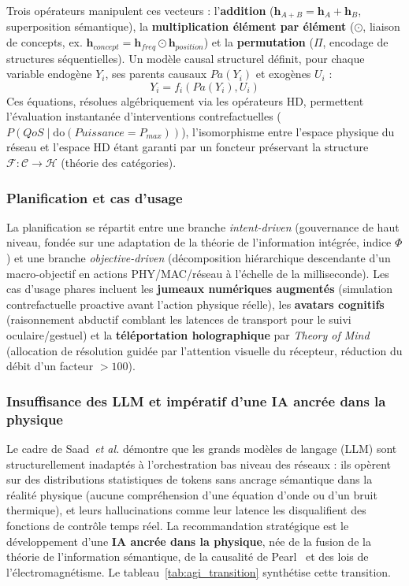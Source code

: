 \documentclass[12pt,a4paper,titlepage]{article}
\begin{document}
Trois opérateurs manipulent ces vecteurs : l'\textbf{addition} ($\mathbf{h}_{A+B} = \mathbf{h}_A + \mathbf{h}_B$, superposition sémantique), la \textbf{multiplication élément par élément} ($\odot$, liaison de concepts, ex. $\mathbf{h}_{concept} = \mathbf{h}_{freq} \odot \mathbf{h}_{position}$) et la \textbf{permutation} ($\Pi$, encodage de structures séquentielles). Un modèle causal structurel définit, pour chaque variable endogène $Y_i$, ses parents causaux $Pa(Y_i)$ et exogènes $U_i$ :
\begin{equation}
    Y_i = f_i(Pa(Y_i), U_i)
    \label{eq:scm}
\end{equation}
Ces équations, résolues algébriquement via les opérateurs HD, permettent l'évaluation instantanée d'interventions contrefactuelles ($P(QoS \mid \mathrm{do}(Puissance = P_{max}))$), l'isomorphisme entre l'espace physique du réseau et l'espace HD étant garanti par un foncteur préservant la structure $\mathcal{F} : \mathcal{C} \to \mathcal{H}$ (théorie des catégories).

\subsubsection{Planification et cas d'usage}

La planification se répartit entre une branche \textit{intent-driven} (gouvernance de haut niveau, fondée sur une adaptation de la théorie de l'information intégrée, indice $\Phi$) et une branche \textit{objective-driven} (décomposition hiérarchique descendante d'un macro-objectif en actions PHY/MAC/réseau à l'échelle de la milliseconde). Les cas d'usage phares incluent les \textbf{jumeaux numériques augmentés} (simulation contrefactuelle proactive avant l'action physique réelle), les \textbf{avatars cognitifs} (raisonnement abductif comblant les latences de transport pour le suivi oculaire/gestuel) et la \textbf{téléportation holographique} par \textit{Theory of Mind} (allocation de résolution guidée par l'attention visuelle du récepteur, réduction du débit d'un facteur $>100$).

\subsubsection{Insuffisance des LLM et impératif d'une IA ancrée dans la physique}

Le cadre de Saad~\textit{et al.} démontre que les grands modèles de langage (LLM) sont structurellement inadaptés à l'orchestration bas niveau des réseaux : ils opèrent sur des distributions statistiques de tokens sans ancrage sémantique dans la réalité physique (aucune compréhension d'une équation d'onde ou d'un bruit thermique), et leurs hallucinations comme leur latence les disqualifient des fonctions de contrôle temps réel. La recommandation stratégique est le développement d'une \textbf{IA ancrée dans la physique}, née de la fusion de la théorie de l'information sémantique, de la causalité de Pearl~\cite{pearl2009} et des lois de l'électromagnétisme. Le tableau~\ref{tab:agi_transition} synthétise cette transition.
\end{document}
